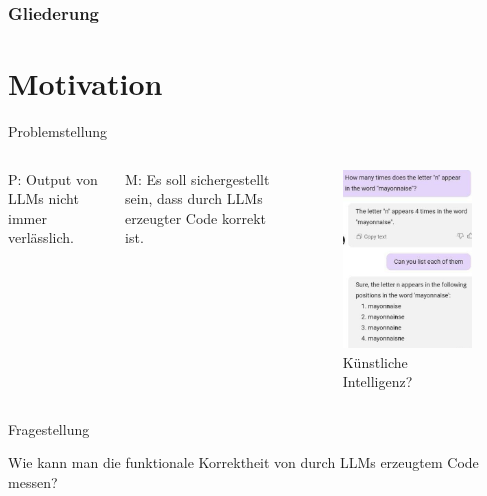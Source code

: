 \documentclass{beamer}              %
\begin{document}
\begin{frame}	
	\frametitle{Gliederung}
	\tableofcontents
\end{frame}

\section{Motivation}
\begin{frame}{Problemstellung}
	\begin{columns}
P: Output von LLMs nicht immer verlässlich.

\vspace{30mm}

M: Es soll sichergestellt sein, dass durch LLMs erzeugter Code korrekt ist.
        \begin{figure}
        \centering
        \includegraphics[width=0.35\paperwidth]{images/mayonnaise.png}
        \caption{Künstliche Intelligenz?\cite{mayonnaise:reddit}}
        \label{fig:stry}
    \end{figure}
    \end{columns}
\end{frame}

\begin{frame}{Fragestellung}

\centering Wie kann man die funktionale Korrektheit von durch LLMs erzeugtem Code messen?

\end{frame}
\end{document}
